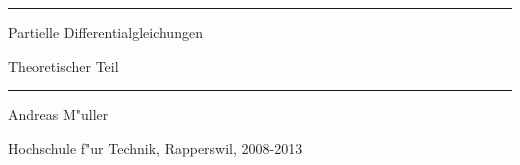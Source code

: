 \documentclass[a4paper,12pt]{book}
\begin{document}
\pagestyle{fancy}
\lhead{}
\rhead{}
\frontmatter
\newcommand\HRule{\noindent\rule{\linewidth}{1.5pt}}
\begin{titlepage}
\HRule
\vspace*{10pt}
\begin{flushright}
{\Huge
Partielle Differentialgleichungen}
\end{flushright}
\begin{flushright}
{\Large Theoretischer Teil}
\end{flushright}
\HRule
\begin{flushright}
\vspace{30pt}
\LARGE
Andreas M"uller
\end{flushright}
\begin{center}
Hochschule f"ur Technik, Rapperswil, 2008-2013
\end{center}
\end{titlepage}

\tableofcontents
\newtheorem{satz}{Satz}[chapter]
\newtheorem{problem}[satz]{Problem}
\newtheorem{hilfssatz}[satz]{Hilfssatz}
\newtheorem{definition}[satz]{Definition}
\newtheorem{annahme}[satz]{Annahme}
\newenvironment{beispiel}[1][Beispiel]{%
\begin{proof}[#1]%
\renewcommand{\qedsymbol}{$\bigcirc$}
}{\end{proof}}
\mainmatter












\end{document}
